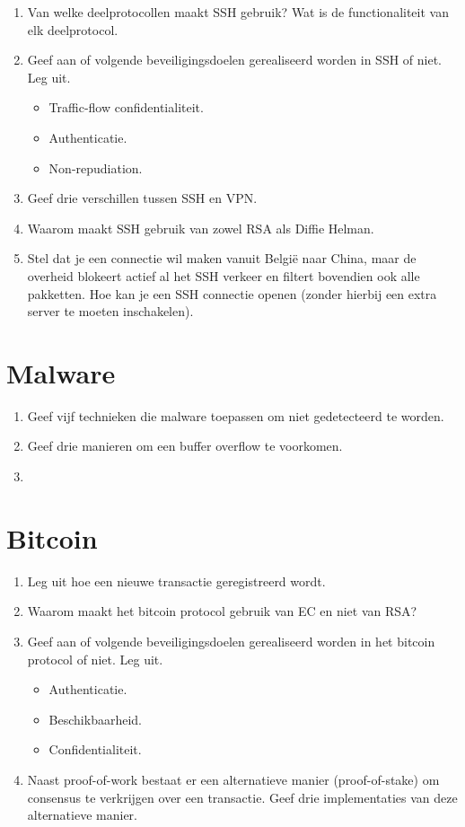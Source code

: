 \documentclass{article}
\begin{document}
\begin{enumerate}
    \item Van welke deelprotocollen maakt SSH gebruik? Wat is de functionaliteit van elk deelprotocol.
    \item Geef aan of volgende beveiligingsdoelen gerealiseerd worden in SSH of niet. Leg uit.
    \begin{itemize}
        \item Traffic-flow confidentialiteit.
        \item Authenticatie.
        \item Non-repudiation.
    \end{itemize}

    \item Geef drie verschillen tussen SSH en VPN.
    \item Waarom maakt SSH gebruik van zowel RSA als Diffie Helman.
    \item Stel dat je een connectie wil maken vanuit België naar China, maar de overheid blokeert actief al het SSH verkeer en filtert bovendien ook alle pakketten. Hoe kan je een SSH connectie openen (zonder hierbij een extra server te moeten inschakelen).
\end{enumerate}

\section{Malware}
\begin{enumerate}
    \item Geef vijf technieken die malware toepassen om niet gedetecteerd te worden.
    \item Geef drie manieren om een buffer overflow te voorkomen.
    \item 
\end{enumerate}

\section{Bitcoin}
\begin{enumerate}
    \item Leg uit hoe een nieuwe transactie geregistreerd wordt.
    \item Waarom maakt het bitcoin protocol gebruik van EC en niet van RSA?
    \item Geef aan of volgende beveiligingsdoelen gerealiseerd worden in het bitcoin protocol of niet. Leg uit.
    \begin{itemize}
        \item Authenticatie.
        \item Beschikbaarheid.
        \item Confidentialiteit.
    \end{itemize}
    \item Naast proof-of-work bestaat er een alternatieve manier (proof-of-stake) om consensus te verkrijgen over een transactie. Geef drie implementaties van deze alternatieve manier.
\end{enumerate}
\end{document}
